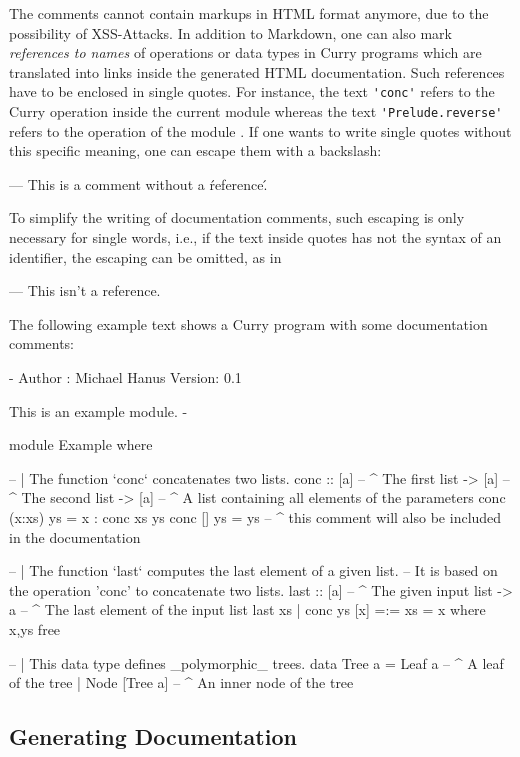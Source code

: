 \begin{description}
The comments cannot contain markups in HTML format anymore,
due to the possibility of XSS-Attacks.
In addition to Markdown,
one can also mark \emph{references to names} of operations or data types
in Curry programs which are translated into links inside
the generated HTML documentation. Such references have to be
enclosed in single quotes. For instance, the text
\verb!'conc'! refers to the Curry operation 
inside the current module whereas the text
\verb!'Prelude.reverse'! refers to the operation 
of the module .
If one wants to write single quotes without this specific
meaning, one can escape them with a backslash:
\begin{curry}
--- This is a comment without a \'reference\'.
\end{curry}
To simplify the writing of documentation comments,
such escaping is only necessary for single words,
i.e., if the text inside quotes has not the syntax of
an identifier, the escaping can be omitted, as in
\begin{curry}
--- This isn't a reference.
\end{curry}
%
The following example text shows a Curry program with some
documentation comments:
\begin{curry}
{-  Author : Michael Hanus
    Version: 0.1

    This is an
    example module.
-}
module Example where

-- | The function `conc` concatenates two lists.
conc :: [a] -- ^ The first list
     -> [a] -- ^ The second list
     -> [a] -- ^ A list containing all elements of the parameters
conc (x:xs) ys = x : conc xs ys
conc []     ys = ys
--  ^ this comment will also be included in the documentation

-- | The function `last` computes the last element of a given list.
--   It is based on the operation 'conc' to concatenate two lists.
last :: [a] -- ^ The given input list
     -> a   -- ^ The last element of the input list
last xs | conc ys [x] =:= xs  = x   where x,ys free

-- | This data type defines _polymorphic_ trees.
data Tree a = Leaf a -- ^ A leaf of the tree
            | Node [Tree a] -- ^ An inner node of the tree
\end{curry}

\subsection{Generating Documentation}


\end{description}
